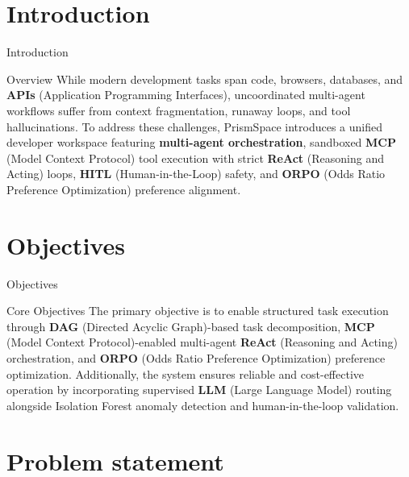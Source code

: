 \section{Introduction}

\begin{frame}{Introduction}
\vspace{0.25cm}
\begin{block}{Overview}
\normalsize
While modern development tasks span code, browsers, databases, and \textbf{APIs} (Application Programming Interfaces), uncoordinated multi-agent workflows suffer from context fragmentation, runaway loops, and tool hallucinations. To address these challenges, PrismSpace introduces a unified developer workspace featuring \textbf{multi-agent orchestration}, sandboxed \textbf{MCP} (Model Context Protocol) tool execution with strict \textbf{ReAct} (Reasoning and Acting) loops, \textbf{HITL} (Human-in-the-Loop) safety, and \textbf{ORPO} (Odds Ratio Preference Optimization) preference alignment.
\end{block}
\end{frame}

\section{Objectives}

\begin{frame}{Objectives}
\vspace{0.25cm}
\begin{block}{Core Objectives}
\normalsize
The primary objective is to enable structured task execution through \textbf{DAG} (Directed Acyclic Graph)-based task decomposition, \textbf{MCP} (Model Context Protocol)-enabled multi-agent \textbf{ReAct} (Reasoning and Acting) orchestration, and \textbf{ORPO} (Odds Ratio Preference Optimization) preference optimization. Additionally, the system ensures reliable and cost-effective operation by incorporating supervised \textbf{LLM} (Large Language Model) routing alongside Isolation Forest anomaly detection and human-in-the-loop validation.
\end{block}
\end{frame}

\section{Problem statement}

